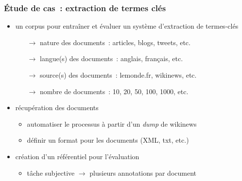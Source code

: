 \begin{frame}
\frametitle{Étude de cas~: extraction de termes clés}

\begin{itemize} \itemsep0.8em
    \item un corpus pour entraîner et évaluer un système d'extraction de 
          termes-clés
    \begin{itemize}
        \item[$\to$] nature des documents~: \alert{articles}, blogs, tweets, etc.
        \item[$\to$] langue(s) des documents~: anglais, \alert{français}, etc.
        \item[$\to$] source(s) des documents~: lemonde.fr, \alert{wikinews}, 
                     etc.
        \item[$\to$] nombre de documents~: 10, 20, 50, \alert{100}, 1000, etc.
    \end{itemize}

    \item récupération des documents
    \begin{itemize}
        \item automatiser le processus à partir d'un \textit{dump} de wikinews
        \item définir un format pour les documents (XML, txt, etc.)
    \end{itemize}

    \item création d'un référentiel pour l'évaluation
    \begin{itemize}
        \item tâche subjective $\to$ plusieurs annotations par document
    \end{itemize}

\end{itemize}

\end{frame}

